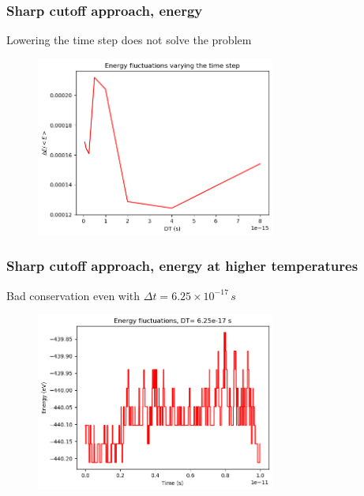 \documentclass{beamer}
\begin{document}
\begin{frame}
    \frametitle{Sharp cutoff approach, energy}

    \begin{center}
        Lowering the time step does not solve the problem
    \end{center}

    \begin{figure}
        \includegraphics[width=0.7\textwidth]{images/lowertimestepawful.png}
    \end{figure}

\end{frame}


\begin{frame}
    \frametitle{Sharp cutoff approach, energy at higher temperatures}

    \centering Bad conservation even with $\Delta t=6.25\times 10^{-17}\,s$
    \begin{figure}
        \includegraphics[width=0.7\textwidth]{images/energyDT-17.png}
    \end{figure}

\end{frame}
\end{document}
